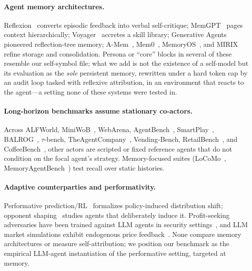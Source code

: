 \documentclass{article}
\begin{document}
\paragraph{Agent memory architectures.} Reflexion~\citep{shinn2023reflexion} converts episodic feedback into verbal self-critique; MemGPT~\citep{packer2023memgpt} pages context hierarchically; Voyager~\citep{wang2023voyager} accretes a skill library; Generative Agents~\citep{park2023generative} pioneered reflection-tree memory; A-Mem~\citep{xu2025amem}, Mem0~\citep{chhikara2025mem0}, MemoryOS~\citep{kang2025memoryos}, and MIRIX~\citep{wang2025mirix} refine storage and consolidation. Persona or ``core'' blocks in several of these resemble our self-symbol file; what we add is not the existence of a self-model but its evaluation as the \emph{sole} persistent memory, rewritten under a hard token cap by an audit loop tasked with reflexive attribution, in an environment that reacts to the agent---a setting none of these systems were tested in.

\paragraph{Long-horizon benchmarks assume stationary co-actors.} Across ALFWorld, MiniWoB~\citep{liu2018miniwob}, WebArena, AgentBench~\citep{liu2024agentbench}, SmartPlay~\citep{wu2024smartplay}, BALROG~\citep{paglieri2025balrog}, $\tau$-bench, TheAgentCompany~\citep{xu2024theagentcompany}, Vending-Bench, RetailBench~\citep{zhang2026retailbench}, and CoffeeBench~\citep{sugiura2026coffeebench}, other actors are scripted or fixed reference agents that do not condition on the focal agent's strategy. Memory-focused suites (LoCoMo~\citep{maharana2024locomo}, MemoryAgentBench~\citep{hu2025memoryagentbench}) test recall over static histories.

\paragraph{Adaptive counterparties and performativity.} Performative prediction/RL~\citep{perdomo2020performative,hardt2023performative,mandal2023performativerl,rank2024performative} formalizes policy-induced distribution shift; opponent shaping~\citep{foerster2018lola,garciasegura2025opponentshaping} studies agents that deliberately induce it. Profit-seeking adversaries have been trained against LLM agents in security settings~\citep{wang2026profitredteam}, and LLM market simulations exhibit endogenous price feedback~\citep{lopezlira2025trade,li2024econagent,zhang2024stockagent}. None compare memory architectures or measure self-attribution; we position our benchmark as the empirical LLM-agent instantiation of the performative setting, targeted at memory.
\end{document}
